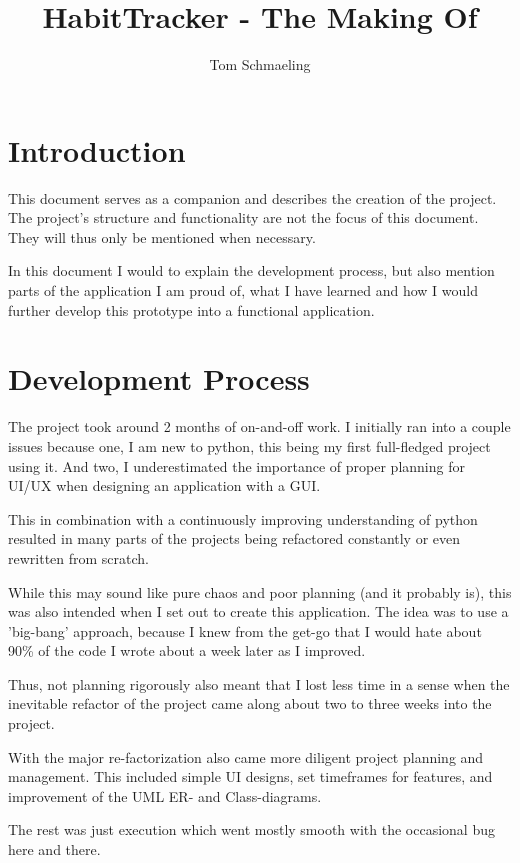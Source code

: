 \documentclass[11pt]{article}
\title{HabitTracker - The Making Of}
\author{Tom Schmaeling}
\date{}
\begin{document}
\maketitle


\section*{Introduction}

This document serves as a companion and describes the creation of the
project. The project's structure and functionality are not the focus
of this document. They will thus only be mentioned when necessary.

In this document I would to explain the development process,
but also mention parts of the application I am proud of, what I have
learned and how I would further develop this prototype into a functional
application.

\section*{Development Process}

The project took around 2 months of on-and-off work. I initially ran
into a couple issues because one, I am new to python, this being my first
full-fledged project using it. And two, I underestimated the importance of
proper planning for UI/UX when designing an application with a GUI.

This in combination with a continuously improving understanding of python
resulted in many parts of the projects being refactored constantly or even
rewritten from scratch.

While this may sound like pure chaos and poor planning (and it probably is),
this was also intended when I set out to create this application. The idea
was to use a 'big-bang' approach, because I knew from the get-go that I
would hate about 90\% of the code I wrote about a week later as I improved.

Thus, not planning rigorously also meant that I lost less time in a sense
when the inevitable refactor of the project came along about two to three
weeks into the project.

With the major re-factorization also came more diligent project planning
and management. This included simple UI designs, set timeframes for features,
and improvement of the UML ER- and Class-diagrams.

The rest was just execution which went mostly smooth with the occasional
bug here and there.
\end{document}
